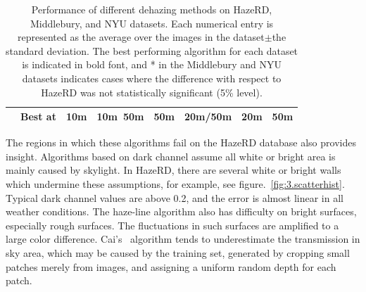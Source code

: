 \begin{landscape}
\begin{table}[htp]
{\begin{tabular}{|c|c|c|c|c|c|c|c|}
\cline{2-8}& Best at & 10m & 10m~50m & 50m & 20m/50m & 20m & 50m\\ \hline 
\end{tabular}}
\caption{Performance of different dehazing methods on HazeRD, Middlebury, and NYU datasets. Each numerical entry is represented as the average over the images in the dataset$\pm$the standard deviation. The best performing algorithm for each dataset is indicated in bold font, and * in the Middlebury and NYU datasets indicates cases where the difference with respect to HazeRD was not statistically significant (5\% level).}
\label{table0}
\end{table}
\end{landscape}


The regions in which these algorithms fail on the HazeRD database also provides insight. Algorithms based on dark channel assume all white or bright area is mainly caused by skylight. In HazeRD, there are several white or bright walls which undermine these assumptions, for example, see figure.~\ref{fig:3.scatterhist}. Typical dark channel values are above 0.2, and the error is almost linear in all weather conditions. The haze-line algorithm also has difficulty on bright surfaces, especially rough surfaces. The fluctuations in such surfaces are amplified to a large color difference. Cai's~\cite{cai2016dehazenet} algorithm tends to underestimate the transmission in sky area, which may be caused by the training set, generated by cropping small patches merely from images, and assigning a uniform random depth for each patch.
